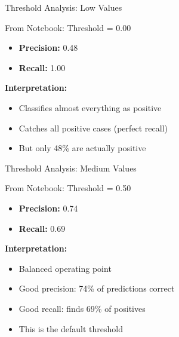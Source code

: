 \documentclass{beamer}
\begin{document}
\begin{frame}{Threshold Analysis: Low Values}
\begin{examplebox}{From Notebook: Threshold = 0.00}
\begin{itemize}
    \item \textbf{Precision:} 0.48
    \item \textbf{Recall:} 1.00
\end{itemize}

\vspace{0.2cm}

\textbf{Interpretation:}
\begin{itemize}
    \item Classifies almost everything as positive
    \item Catches all positive cases (perfect recall)
    \item But only 48\% are actually positive
\end{itemize}
\end{examplebox}
\end{frame}

\begin{frame}{Threshold Analysis: Medium Values}
\begin{examplebox}{From Notebook: Threshold = 0.50}
\begin{itemize}
    \item \textbf{Precision:} 0.74
    \item \textbf{Recall:} 0.69
\end{itemize}

\vspace{0.2cm}

\textbf{Interpretation:}
\begin{itemize}
    \item Balanced operating point
    \item Good precision: 74\% of predictions correct
    \item Good recall: finds 69\% of positives
    \item This is the default threshold
\end{itemize}
\end{examplebox}
\end{frame}
\end{document}
